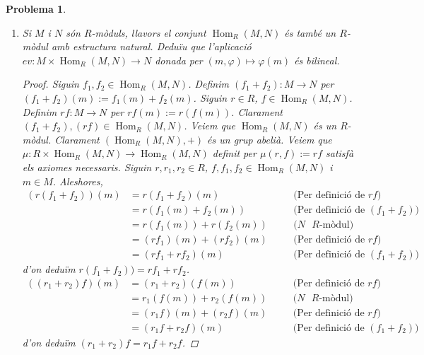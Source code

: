 \documentclass[compress]{article}
\newtheorem{problema}{Problema}
\theoremstyle{definition}
\DeclareMathOperator{\Hom}{Hom}
\begin{document}
\begin{problema}
\begin{enumerate}
         \item Si $M$ i $N$ són $R$-mòduls, llavors el conjunt $\Hom_{R}(M,N)$ és també un $R$-mòdul amb estructura natural. Deduïu que l'aplicació $ev:M\times\Hom_{R}(M,N)\rightarrow N$ donada per $(m,\varphi)\mapsto\varphi(m)$ és bilineal.
         \begin{proof}
             Siguin $f_{1},f_{2}\in\Hom_{R}(M,N)$. Definim $(f_{1}+f_{2}):M\rightarrow N$ per $(f_{1}+f_{2})(m):=f_{1}(m)+f_{2}(m)$. Siguin $r\in R$, $f\in\Hom_{R}(M,N)$. Definim $rf:M\rightarrow N$ per $rf(m):=r(f(m))$. Clarament $(f_{1}+f_{2}),(rf)\in\Hom_{R}(M,N)$.\newline
             Veiem que $\Hom_{R}(M,N)$ és un $R$-mòdul. Clarament $(\Hom_{R}(M,N),+)$ és un grup abelià. Veiem que $\mu:R\times\Hom_{R}(M,N)\rightarrow\Hom_{R}(M,N)$ definit per $\mu(r,f):=rf$ satisfà els axiomes necessaris. Siguin $r,r_{1},r_{2}\in R$, $f,f_{1},f_{2}\in\Hom_{R}(M,N)$ i $m\in M$. Aleshores,
             \begin{align*}
                 (r(f_{1}+f_{2}))(m)
                 &=r(f_{1}+f_{2})(m)
                 &\quad&\textrm{(Per definició de $rf$)}\\
                 &=r(f_{1}(m)+f_{2}(m))
                 &\quad&\textrm{(Per definició de $(f_{1}+f_{2})$)}\\
                 &=r(f_{1}(m))+r(f_{2}(m))
                 &\quad&\textrm{($N$ $R$-mòdul)}\\
                 &=(rf_{1})(m)+(rf_{2})(m)
                 &\quad&\textrm{(Per definició de $rf$)}\\
                 &=(rf_{1}+rf_{2})(m)
                 &\quad&\textrm{(Per definició de $(f_{1}+f_{2})$)}
             \end{align*}
             d'on deduïm $r(f_{1}+f_{2}))=rf_{1}+rf_{2}$.
             \begin{align*}
                 ((r_{1}+r_{2})f)(m)
                 &=(r_{1}+r_{2})(f(m))
                 &\quad&\textrm{(Per definició de $rf$)}\\
                 &=r_{1}(f(m))+r_{2}(f(m))
                 &\quad&\textrm{($N$ $R$-mòdul)}\\
                 &=(r_{1}f)(m)+(r_{2}f)(m)
                 &\quad&\textrm{(Per definició de $rf$)}\\
                 &=(r_{1}f+r_{2}f)(m)
                 &\quad&\textrm{(Per definició de $(f_{1}+f_{2})$)}
             \end{align*}
             d'on deduïm $(r_{1}+r_{2})f=r_{1}f+r_{2}f$.

\end{proof}
\end{enumerate}
\end{problema}
\end{document}
